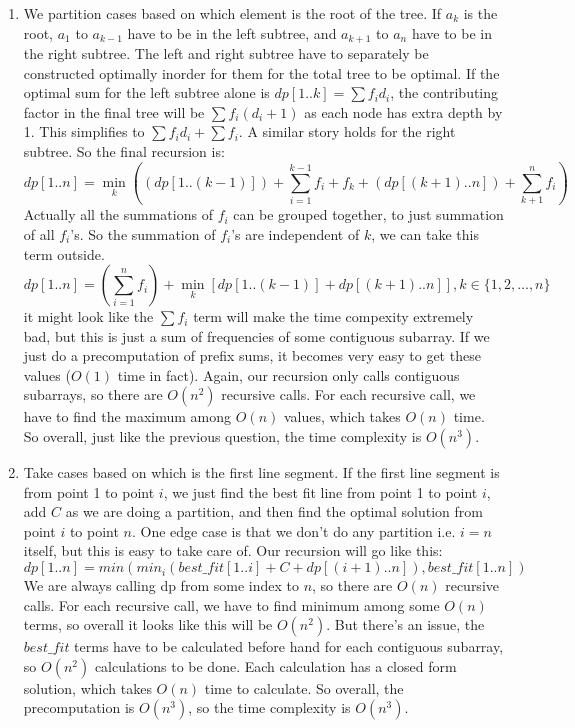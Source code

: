 \documentclass[12pt]{report}
\begin{document}
\begin{enumerate}[label=\textbf{\arabic*.}]
  \item We partition cases based on which element is the root of the tree. If $a_k$ is the root, $a_1$ to $a_{k-1}$ have to be in the left subtree, and $a_{k+1}$ to $a_n$ have to be in the right subtree.
  The left and right subtree have to separately be constructed optimally inorder for them for the total tree to be optimal. If the optimal sum for the left subtree alone is $dp[1..k] = \sum f_i d_i$, the 
  contributing factor in the final tree will be $\sum f_i (d_i + 1)$ as each node has extra depth by 1. This simplifies to $\sum f_i d_i + \sum f_i$. A similar story holds for the right subtree. So the
  final recursion is:
  \[dp[1 .. n] = \min_k \left((dp[1 .. (k-1)]) + \sum_{i=1}^{k-1} f_i + f_k + (dp[(k+1) .. n]) + \sum_{k+1}^{n} f_i \right) \] 
  Actually all the summations of $f_i$ can be grouped together, to just summation of all $f_i$'s. So the summation of $f_i$'s are independent of $k$, we can take this term outside.
  \[dp[1 .. n] = \left(\sum_{i=1}^n f_i \right) + \min_k [dp[1 .. (k-1)] + dp[(k+1) .. n]], k \in \{1, 2, \dots, n\} \] 
  it might look like the $\sum f_i$ term will make the time compexity extremely bad, but this is just a sum of frequencies of some contiguous subarray. If we just do a precomputation of prefix sums, it
  becomes very easy to get these values ($O(1)$ time in fact). Again, our recursion only calls contiguous subarrays, so there are $O(n^2)$ recursive calls. For each recursive call, we have to find the maximum
  among $O(n)$ values, which takes $O(n)$ time. So overall, just like the previous question, the time complexity is $O(n^3)$.

  \item Take cases based on which is the first line segment. If the first line segment is from point 1 to point $i$, we just find the best fit line from point 1 to point $i$, add $C$ as we are doing a partition, 
  and then find the optimal solution from point $i$ to point $n$. One edge case is that we don't do any partition i.e. $i = n$ itself, but this is easy to take care of. Our recursion will go like this:
  \[dp[1 .. n] = min (min_i (best\_fit[1 .. i] + C + dp[(i+1) .. n]), best\_fit[1 .. n]) \]
  We are always calling dp from some index to $n$, so there are $O(n)$ recursive calls. For each recursive call, we have to find minimum among some $O(n)$ terms, so overall it looks like this will be $O(n^2)$.
  But there's an issue, the $best\_fit$ terms have to be calculated before hand for each contiguous subarray, so $O(n^2)$ calculations to be done. Each calculation has a closed form solution, which takes $O(n)$
  time to calculate. So overall, the precomputation is $O(n^3)$, so the time complexity is $O(n^3)$.


\end{enumerate}
\end{document}
